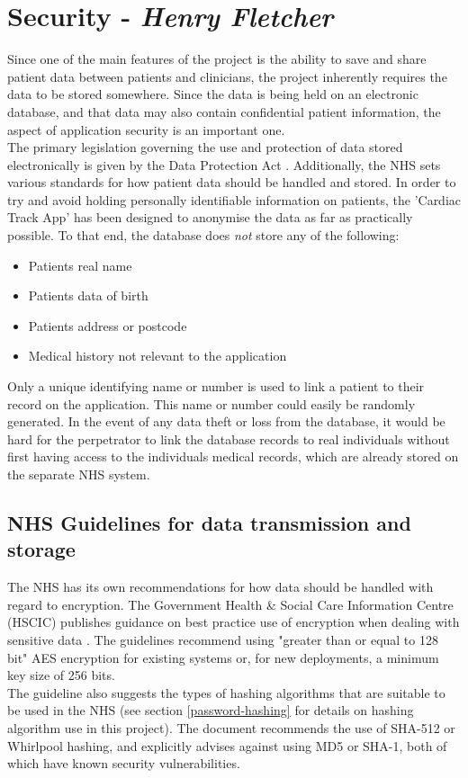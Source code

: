 \documentclass[11pt]{article}
\begin{document}
\section{Security - \textit{Henry Fletcher}} \label{security}

Since one of the main features of the project is the ability to save and share patient data between patients and clinicians, the project inherently requires the data to be stored somewhere. Since the data is being held on an electronic database, and that data may also contain confidential patient information, the aspect of application security is an important one.
\\ \indent
The primary legislation governing the use and protection of data stored electronically is given by the Data Protection Act \cite{ukDPA}. Additionally, the NHS sets various standards for how patient data should be handled and stored. In order to try and avoid holding personally identifiable information on patients, the 'Cardiac Track App' has been designed to anonymise the data as far as practically possible. To that end, the database does \textit{not} store any of the following: 
\begin{itemize}
  \item Patients real name
  \item Patients data of birth
  \item Patients address or postcode
  \item Medical history not relevant to the application
\end{itemize}
Only a unique identifying name or number is used to link a patient to their record on the application. This name or number could easily be randomly generated. In the event of any data theft or loss from the database, it would be hard for the perpetrator to link the database records to real individuals without first having access to the individuals medical records, which are already stored on the separate NHS system.

\subsection{NHS Guidelines for data transmission and storage} \label{security:nhsguidelines}
The NHS  has its own recommendations for how data should be handled with regard to encryption. The Government Health \& Social Care Information Centre (HSCIC) publishes guidance on best practice use of encryption when dealing with sensitive data \cite{NHS:hsic:acs}. The guidelines recommend using "greater than or equal to 128 bit" AES encryption for existing systems or, for new deployments, a minimum key size of 256 bits. 
\\ \indent
The guideline also suggests the types of hashing algorithms that are suitable to be used in the NHS (see section \ref{password-hashing} for details on hashing algorithm use in this project). The document recommends the use of SHA-512 or Whirlpool hashing, and explicitly advises against using MD5 or SHA-1, both of which have known security vulnerabilities.
\end{document}
